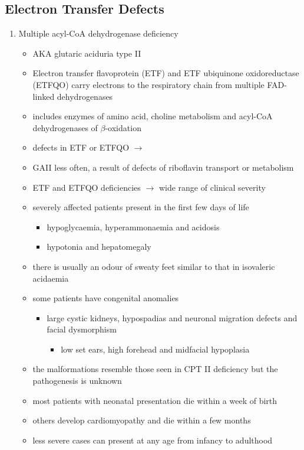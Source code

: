\documentclass{scrartcl}
\begin{document}
\subsection{Electron Transfer Defects}
\label{sec:org9984174}
\begin{enumerate}
\item Multiple acyl-CoA dehydrogenase deficiency
\label{sec:org70c8ce2}
\begin{itemize}
\item AKA glutaric aciduria type II
\item Electron transfer flavoprotein (ETF) and ETF ubiquinone
oxidoreductase (ETFQO) carry electrons to the respiratory chain from
multiple FAD-linked dehydrogenases
\item includes enzymes of amino acid, choline metabolism and acyl-CoA
dehydrogenases of \(\beta\)-oxidation
\item defects in ETF or ETFQO \(\to\)
\item GAII less often, a result of defects of riboflavin transport or
metabolism
\item ETF and ETFQO deficiencies \(\to\) wide range of clinical severity
\item severely affected patients present in the first few days of life
\begin{itemize}
\item hypoglycaemia, hyperammonaemia and acidosis
\item hypotonia and hepatomegaly
\end{itemize}
\item there is usually an odour of sweaty feet similar to that in isovaleric acidaemia
\item some patients have congenital anomalies
\begin{itemize}
\item large cystic kidneys, hypospadias and neuronal migration defects and facial dysmorphism
\begin{itemize}
\item low set ears, high forehead and midfacial hypoplasia
\end{itemize}
\end{itemize}
\item the malformations resemble those seen in CPT II deficiency but the pathogenesis is unknown
\item most patients with neonatal presentation die within a week of birth
\item others develop cardiomyopathy and die within a few months
\item less severe cases can present at any age from infancy to adulthood

\end{itemize}
\end{enumerate}
\end{document}
